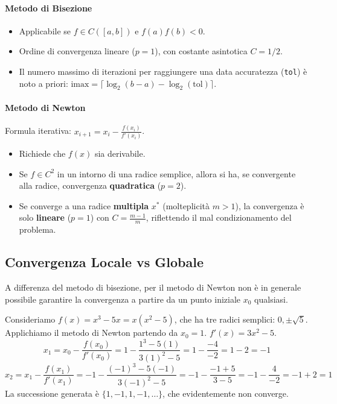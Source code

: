 \paragraph{Metodo di Bisezione}
\begin{itemize}
    \item Applicabile se $f \in C([a,b])$ e $f(a)f(b) < 0$.
    \item Ordine di convergenza lineare ($p=1$), con costante asintotica $C=1/2$.
    \item Il numero massimo di iterazioni per raggiungere una data accuratezza (\texttt{tol}) è noto a priori: $\text{imax} = \lceil \log_2(b-a) - \log_2(\text{tol}) \rceil$.
\end{itemize}

\paragraph{Metodo di Newton}
Formula iterativa: $x_{i+1} = x_i - \frac{f(x_i)}{f'(x_i)}$.
\begin{itemize}
    \item Richiede che $f(x)$ sia derivabile.
    \item Se $f \in C^2$ in un intorno di una radice semplice, allora si ha, se convergente alla radice, convergenza \textbf{quadratica} ($p=2$).
    \item Se converge a una radice \textbf{multipla} $x^*$ (molteplicità $m>1$), la convergenza è solo \textbf{lineare} ($p=1$) con $C = \frac{m-1}{m}$, riflettendo il mal condizionamento del problema.
\end{itemize}

\subsection{Convergenza Locale vs Globale}
A differenza del metodo di bisezione, per il metodo di Newton non è in generale possibile garantire la convergenza a partire da un punto iniziale $x_0$ qualsiasi.

\begin{esempio}
Consideriamo $f(x) = x^3 - 5x = x(x^2-5)$, che ha tre radici semplici: $0, \pm\sqrt{5}$. Applichiamo il metodo di Newton partendo da $x_0=1$.
$f'(x) = 3x^2 - 5$.
$$ x_1 = x_0 - \frac{f(x_0)}{f'(x_0)} = 1 - \frac{1^3 - 5(1)}{3(1)^2 - 5} = 1 - \frac{-4}{-2} = 1 - 2 = -1 $$
$$ x_2 = x_1 - \frac{f(x_1)}{f'(x_1)} = -1 - \frac{(-1)^3 - 5(-1)}{3(-1)^2 - 5} = -1 - \frac{-1 + 5}{3 - 5} = -1 - \frac{4}{-2} = -1 + 2 = 1 $$
La successione generata è $\{1, -1, 1, -1, \dots\}$, che evidentemente non converge.
\end{esempio}

